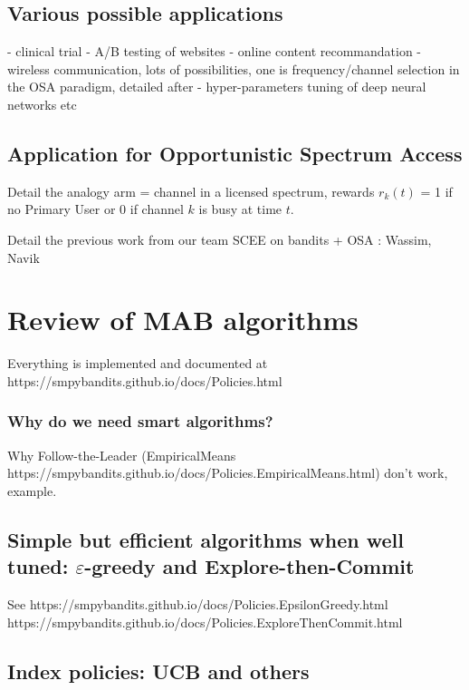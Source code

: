 \subsection{Various possible applications}

- clinical trial
- A/B testing of websites
- online content recommandation
- wireless communication, lots of possibilities, one is frequency/channel selection in the OSA paradigm, detailed after
- hyper-parameters tuning of deep neural networks etc


\subsection{Application for Opportunistic Spectrum Access}

Detail the analogy arm = channel in a licensed spectrum, rewards $r_k(t)$ = 1 if no Primary User or 0 if channel $k$ is busy at time $t$.

Detail the previous work from our team SCEE on bandits + OSA : Wassim, Navik


\section{Review of MAB algorithms}
\label{sec:2:famousMABalgorithms}

Everything is implemented and documented at
https://smpybandits.github.io/docs/Policies.html


\subsubsection{Why do we need smart algorithms?}
Why Follow-the-Leader (EmpiricalMeans https://smpybandits.github.io/docs/Policies.EmpiricalMeans.html) don't work, example.

\subsection{Simple but efficient algorithms when well tuned: $\varepsilon$-greedy and Explore-then-Commit}

See
https://smpybandits.github.io/docs/Policies.EpsilonGreedy.html
https://smpybandits.github.io/docs/Policies.ExploreThenCommit.html


\subsection{Index policies: UCB and others}

